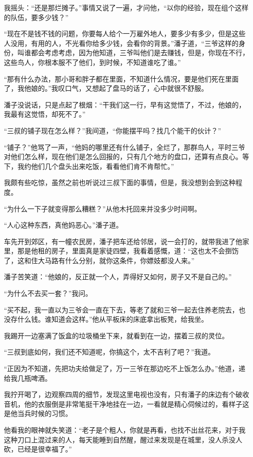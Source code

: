 我摇头：“还是那烂摊子。”事情又说了一遍，才问他，“以你的经验，现在组个这样的队伍，要多少钱？”

“现在不是钱不钱的问题，你要每人给个一万雇外地人，要多少有多少，但是这些人没用，有用的人，不光看你给多少钱，会看你的背景。”潘子道，“三爷这样的身份，叫谁都会考虑考虑，因为他知道，三爷叫他们是去赚钱，但是，你现在不行，这些鸟人，你根本服不了他们，到时候，不知道谁吃了谁。”

“那有什么办法，那小哥和胖子都在里面，不知道什么情况，要是他们死在里面了，我他娘的。”我叹口气，又想起了盘马的话了，心中就很不舒服。

潘子没说话，只是点起了根烟：“干我们这一行，早有这觉悟了，不过，他娘的，我最有这觉悟，却死不了。”

“三叔的铺子现在怎么样？”我间道，“你能摆平吗？找几个能干的伙计？”

“铺子？”他骂了一声，“他妈的哪里还有什么铺子，全烂了，那群鸟人，平时三爷对他们怎么样，现在他们是怎么回报的，只有几个地方的盘口，还算有点良心。等下，我约他们几个盘头出来吃饭，看看他们肯不肯帮忙。”

我颇有些吃惊，虽然之前也听说过三叔下面的事情，但是，我没想到会到这种程度。

“为什么一下子就变得那么糟糕？”从他木托回来并没多少时间啊。

“人心这种东西，真他妈恶心。”潘子道。

车先开到郊区，有一幢农民房，潘子把车还给邻居，说一会打的，就带我进了他家里，那是他租的房子，里面真是家徒四壁，我看着感慨，道：“这也太不会捯饬了，这和住大马路有什么分别，就你这条件，你嫖妓都没人来。”

潘子苦笑道：“他娘的，反正就一个人，弄得好又如何，房子又不是自己的。”

“为什么不去买一套？”我问。

“买不起，我一直以为三爷会一直在下去，等老了就和三爷一起去住养老院去，也没存什么钱。谁知道会这样。”他从平板床的床底拿出板凳，给我坐。

我踢开一边塞满了饭盒的垃圾桶坐下来，就看到在一边，摆着三叔的灵位。

“三叔到底如何，我们还不知道呢，你搞这个，太不吉利了吧？”我道。

“正因为不知道，先把功夫给做足了，万一三爷在那边吃不上饭怎么办。”他道，递给我几瓶啤酒。

我拧开喝了，边观察四周的细节，发现这里电视也没有，只有潘子的床边有个破收音机，他的衣服倒是非常笔挺干净地挂在一边，一看就是精心伺候过的，看样子这是他当兵时候的习惯。

他看我的眼神就失笑道：“老子是个粗人，你就是再看，也找不出丝花来，对于我这种刀口上混过来的人，每天能睡到自然醒，醒过来发现是在城里，没人杀没人砍，已经是很幸福了。”

